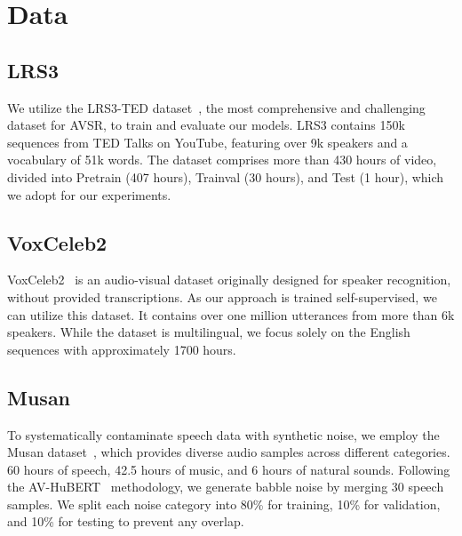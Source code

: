 \section{Data}

\subsection{LRS3}

We utilize the LRS3-TED dataset~\cite{DATA_2018_LRS3}, the most comprehensive and challenging dataset for AVSR, to train and evaluate our models. LRS3 contains 150k sequences from TED Talks on YouTube, featuring over 9k speakers and a vocabulary of 51k words. The dataset comprises more than 430 hours of video, divided into Pretrain (407 hours), Trainval (30 hours), and Test (1 hour), which we adopt for our experiments.

\subsection{VoxCeleb2}

VoxCeleb2~\cite{DATA_2018_Voxcel2} is an audio-visual dataset originally designed for speaker recognition, without provided transcriptions. As our approach is trained self-supervised, we can utilize this dataset. It contains over one million utterances from more than 6k speakers. While the dataset is multilingual, we focus solely on the English sequences with approximately 1700 hours.

\subsection{Musan}

To systematically contaminate speech data with synthetic noise, we employ the Musan dataset~\cite{DATA_2015_musan}, which provides diverse audio samples across different categories. 60 hours of speech, 42.5 hours of music, and 6 hours of natural sounds. Following the AV-HuBERT~\cite{AVSR_avhubert_2022} methodology, we generate babble noise by merging 30 speech samples. We split each noise category into 80\% for training, 10\% for validation, and 10\% for testing to prevent any overlap.